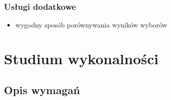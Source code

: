 \documentclass[polish,11pt]{aghthesis}
\begin{document}
\subsubsection{Usługi dodatkowe}
\begin{itemize}
	\item wygodny sposób porównywania wyników wyborów
\end{itemize}



\section{Studium wykonalności}
  
\subsection{Opis wymagań}
\end{document}
